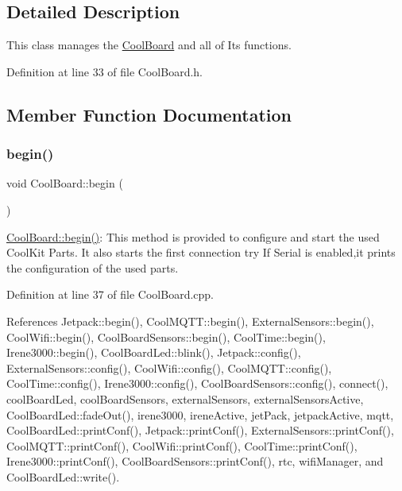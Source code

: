 \subsection{Detailed Description}
This class manages the \hyperlink{classCoolBoard}{Cool\+Board} and all of Its functions. 

Definition at line 33 of file Cool\+Board.\+h.



\subsection{Member Function Documentation}
\mbox{\label{classCoolBoard_acba7c5aef7268b2c0044bdb54d3b9d76}} 
\subsubsection{\texorpdfstring{begin()}{begin()}}
{\footnotesize\ttfamily void Cool\+Board\+::begin (\begin{DoxyParamCaption}{ }\end{DoxyParamCaption})}

\hyperlink{classCoolBoard_acba7c5aef7268b2c0044bdb54d3b9d76}{Cool\+Board\+::begin()}\+: This method is provided to configure and start the used Cool\+Kit Parts. It also starts the first connection try If Serial is enabled,it prints the configuration of the used parts. 

Definition at line 37 of file Cool\+Board.\+cpp.



References Jetpack\+::begin(), Cool\+M\+Q\+T\+T\+::begin(), External\+Sensors\+::begin(), Cool\+Wifi\+::begin(), Cool\+Board\+Sensors\+::begin(), Cool\+Time\+::begin(), Irene3000\+::begin(), Cool\+Board\+Led\+::blink(), Jetpack\+::config(), External\+Sensors\+::config(), Cool\+Wifi\+::config(), Cool\+M\+Q\+T\+T\+::config(), Cool\+Time\+::config(), Irene3000\+::config(), Cool\+Board\+Sensors\+::config(), connect(), cool\+Board\+Led, cool\+Board\+Sensors, external\+Sensors, external\+Sensors\+Active, Cool\+Board\+Led\+::fade\+Out(), irene3000, irene\+Active, jet\+Pack, jetpack\+Active, mqtt, Cool\+Board\+Led\+::print\+Conf(), Jetpack\+::print\+Conf(), External\+Sensors\+::print\+Conf(), Cool\+M\+Q\+T\+T\+::print\+Conf(), Cool\+Wifi\+::print\+Conf(), Cool\+Time\+::print\+Conf(), Irene3000\+::print\+Conf(), Cool\+Board\+Sensors\+::print\+Conf(), rtc, wifi\+Manager, and Cool\+Board\+Led\+::write().


